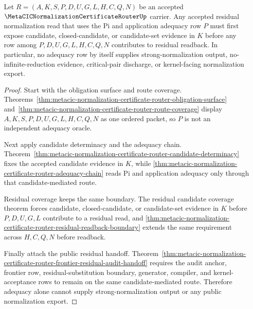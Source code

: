 \begin{theorem}
\label{thm:metacic-normalization-certificate-router-evidence-adequacy-lock}
Let $R=(A,K,S,P,D,U,G,L,H,C,Q,N)$ be an accepted $\MetaCICNormalizationCertificateRouterUp$ carrier. Any accepted residual normalization read that uses the Pi and application adequacy row $P$ must first expose candidate, closed-candidate, or candidate-set evidence in $K$ before any row among $P,D,U,G,L,H,C,Q,N$ contributes to residual readback. In particular, no adequacy row by itself supplies strong-normalization output, no-infinite-reduction evidence, critical-pair discharge, or kernel-facing normalization export.
\end{theorem}
\begin{proof}
Start with the obligation surface and route coverage. Theorems~\ref{thm:metacic-normalization-certificate-router-obligation-surface} and~\ref{thm:metacic-normalization-certificate-router-route-coverage} display $A,K,S,P,D,U,G,L,H,C,Q,N$ as one ordered packet, so $P$ is not an independent adequacy oracle.

Next apply candidate determinacy and the adequacy chain. Theorem~\ref{thm:metacic-normalization-certificate-router-candidate-determinacy} fixes the accepted candidate evidence in $K$, while \autoref{thm:metacic-normalization-certificate-router-adequacy-chain} reads Pi and application adequacy only through that candidate-mediated route.

Residual coverage keeps the same boundary. The residual candidate coverage theorem forces candidate, closed-candidate, or candidate-set evidence in $K$ before $P,D,U,G,L$ contribute to a residual read, and \autoref{thm:metacic-normalization-certificate-router-residual-readback-boundary} extends the same requirement across $H,C,Q,N$ before readback.

Finally attach the public residual handoff. Theorem~\ref{thm:metacic-normalization-certificate-router-frontier-residual-audit-handoff} requires the audit anchor, frontier row, residual-substitution boundary, generator, compiler, and kernel-acceptance rows to remain on the same candidate-mediated route. Therefore adequacy alone cannot supply strong-normalization output or any public normalization export.
\end{proof}

